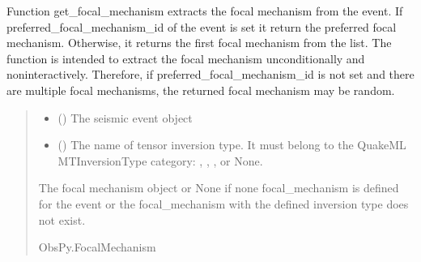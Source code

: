 \documentclass[letterpaper,10pt,english]{sphinxmanual}
\begin{document}
\begin{fulllineitems}
\label{\detokenize{api_core:amw.core.utils.get_focal_mechanism}}
\pysigstartsignatures
{}
\pysigstopsignatures
\sphinxAtStartPar
Function get\_focal\_mechanism extracts the focal mechanism from the event.
If preferred\_focal\_mechanism\_id of the event is set it return the preferred focal mechanism.
Otherwise, it returns the first focal mechanism from the list.
The function is intended to extract the focal mechanism unconditionally and non\sphinxhyphen{}interactively.
Therefore, if preferred\_focal\_mechanism\_id is not set and there are multiple focal mechanisms,
the returned focal mechanism may be random.
\begin{quote}\begin{description}
\begin{itemize}
\item {} 
\sphinxAtStartPar
{} () \textendash{} The seismic event object

\item {} 
\sphinxAtStartPar
{} (\sphinxstyleliteralemphasis{\sphinxupquote{(}}\sphinxstyleliteralemphasis{\sphinxupquote{)}}) \textendash{} The name of tensor inversion type.
It must belong to the QuakeML MTInversionType category:
, , , or None.

\end{itemize}

\sphinxAtStartPar
The focal mechanism object or None if none focal\_mechanism is defined for the event
or the focal\_mechanism with the defined inversion type does not exist.

\sphinxAtStartPar
ObsPy.FocalMechanism

\end{description}\end{quote}

\end{fulllineitems}
\end{document}
